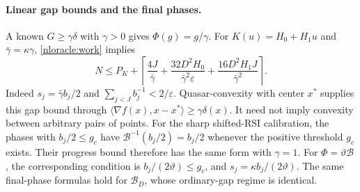 \paragraph{Linear gap bounds and the final phases.}
A known $G\ge\gamma\delta$ with $\gamma>0$ gives $\Phi(g)=g/\gamma$.
For $K(u)=H_0+H_1u$ and $\bar\gamma=\kappa\gamma$,
\eqref{nloracle:work} implies
\[
 N\le P_K+\left\lceil
 \frac{4J}{\bar\gamma}+
 \frac{32D^2H_0}{\bar\gamma^2\varepsilon}+
 \frac{16D^2H_1J}{\bar\gamma^2}\right\rceil.
\]
Indeed $s_j=\bar\gamma b_j/2$ and
$\sum_{j<J}b_j^{-1}<2/\varepsilon$.
Quasar-convexity with center $x^*$ supplies this gap bound through
$\langle\nabla f(x),x-x^*\rangle\ge\gamma\delta(x)$.
It need not imply convexity between arbitrary pairs of points.
For the sharp shifted-RSI calibration, the phases with
$b_j/2\le g_c$ have $\mathcal B^{-1}(b_j/2)=b_j/2$ whenever the
positive threshold $g_c$ exists. Their progress bound therefore has
the same form with $\gamma=1$.
For $\Phi=\vartheta\mathcal B$, the corresponding condition is
$b_j/(2\vartheta)\le g_c$, and $s_j=\kappa b_j/(2\vartheta)$.
The same final-phase formulas hold for $\mathcal B_D$, whose ordinary-gap
regime is identical.
